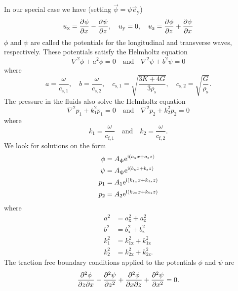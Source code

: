 In our special case we have (setting $\vec{\psi} = \psi\vec{e}_{\mathrm{y}}$)
\begin{equation*}
	u_{\mathrm{x}} = \pderiv{\phi}{x} - \pderiv{\psi}{z},\quad u_{\mathrm{y}} = 0,\quad u_{\mathrm{z}} = \pderiv{\phi}{z} + \pderiv{\psi}{x}
\end{equation*}
$\phi$ and $\psi$ are called the potentials for the longitudinal and transverse waves, respectively. These potentials satisfy the Helmholtz equation
\begin{equation*}
	\nabla^2\phi + a^2\phi = 0\quad\text{and}\quad \nabla^2\psi + b^2\psi = 0
\end{equation*}
where
\begin{equation*}
	a=\frac{\omega}{c_{\mathrm{s},1}},\quad b=\frac{\omega}{c_{\mathrm{s},2}},\quad c_{\mathrm{s},1} = \sqrt{\frac{3K+4G}{3\rho_{\mathrm{s}}}},\quad c_{\mathrm{s},2} = \sqrt{\frac{G}{\rho_{\mathrm{s}}}}.
\end{equation*}
The pressure in the fluids also solve the Helmholtz equation
\begin{equation*}
	\nabla^2 p_1 + k_1^2p_1 = 0\quad\text{and}\quad \nabla^2p_2 + k_2^2p_2 = 0
\end{equation*}
where
\begin{equation*}
	k_1=\frac{\omega}{c_{\mathrm{f},1}}\quad\text{and}\quad k_2=\frac{\omega}{c_{\mathrm{f},2}}.
\end{equation*}
We look for solutions on the form
\begin{align*}
	\phi &= A_{\upphi}\euler^{\imag (a_{\mathrm{x}} x + a_{\mathrm{z}}z)}\\
	\psi &= A_{\uppsi}\euler^{\imag (b_{\mathrm{x}} x + b_{\mathrm{z}}z)}\\
	p_1 &= A_1\euler^{\imag (k_{1\mathrm{x}} x + k_{1\mathrm{z}}z)}\\
	p_2 &= A_2\euler^{\imag (k_{2\mathrm{x}} x + k_{2\mathrm{z}}z)}
\end{align*}
where
\begin{align*}
	a^2 &= a_{\mathrm{x}}^2 + a_{\mathrm{z}}^2\\
	b^2 &= b_{\mathrm{x}}^2 + b_{\mathrm{z}}^2\\
	k_1^2 &= k_{1\mathrm{x}}^2 + k_{1\mathrm{z}}^2\\
	k_2^2 &= k_{2\mathrm{x}}^2 + k_{2\mathrm{z}}^2.
\end{align*}
The traction free boundary conditions applied to the potentials $\phi$ and $\psi$ are
\begin{equation*}
	\ppderiv{\phi}{z}{x} - \pderiv[2]{\psi}{z} + \ppderiv{\phi}{x}{z} + \pderiv[2]{\psi}{x} = 0.
\end{equation*}
